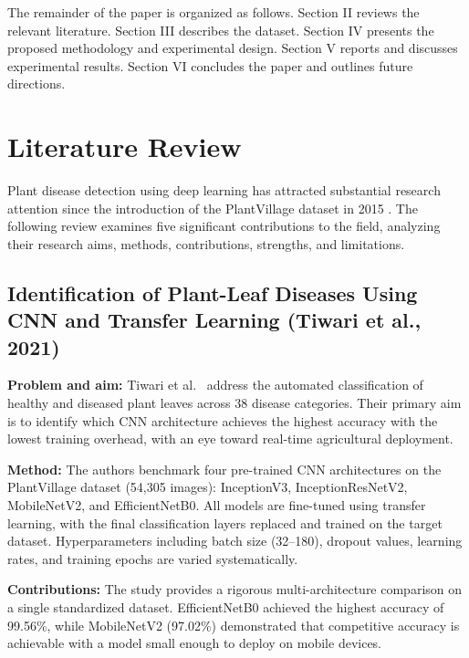 \documentclass[10pt,twocolumn]{article}
\begin{document}
The remainder of the paper is organized as follows. Section II reviews the relevant literature. Section III describes the dataset. Section IV presents the proposed methodology and experimental design. Section V reports and discusses experimental results. Section VI concludes the paper and outlines future directions.

\section{Literature Review}

Plant disease detection using deep learning has attracted substantial research attention since the introduction of the PlantVillage dataset in 2015 \cite{HughesSalathe2015}. The following review examines five significant contributions to the field, analyzing their research aims, methods, contributions, strengths, and limitations.

\subsection{Identification of Plant-Leaf Diseases Using CNN and Transfer Learning (Tiwari et al., 2021)}

\textbf{Problem and aim:} Tiwari et al.\ \cite{Tiwari2021} address the automated classification of healthy and diseased plant leaves across 38 disease categories. Their primary aim is to identify which CNN architecture achieves the highest accuracy with the lowest training overhead, with an eye toward real-time agricultural deployment.

\textbf{Method:} The authors benchmark four pre-trained CNN architectures on the PlantVillage dataset (54,305 images): InceptionV3, InceptionResNetV2, MobileNetV2, and EfficientNetB0. All models are fine-tuned using transfer learning, with the final classification layers replaced and trained on the target dataset. Hyperparameters including batch size (32--180), dropout values, learning rates, and training epochs are varied systematically.

\textbf{Contributions:} The study provides a rigorous multi-architecture comparison on a single standardized dataset. EfficientNetB0 achieved the highest accuracy of 99.56\%, while MobileNetV2 (97.02\%) demonstrated that competitive accuracy is achievable with a model small enough to deploy on mobile devices.
\end{document}
